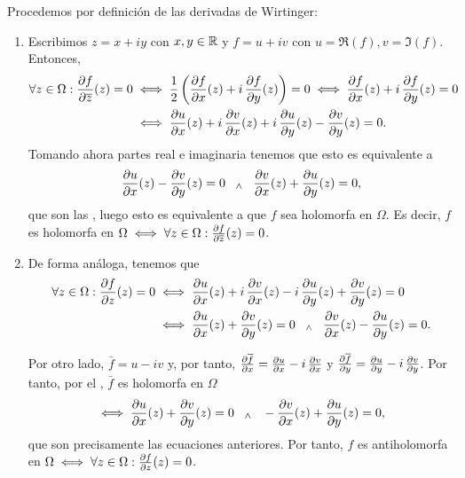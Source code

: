 \begin{dem}
    Procedemos por definición de las derivadas de Wirtinger:
    \begin{enumerate}[label=\textnormal{(\arabic*)}]
        \item Escribimos $z = x + iy$ con $x, y \in \mathbb{R}$ y $f = u + iv$ con $u = \Re(f), v = \Im(f)$. Entonces,
        \[
        \begin{aligned}
            \forall z \in \Omega : \pdv{f}{\overline{z}}(z) = 0 &\iff \frac{1}{2} \left(\pdv{f}{x}(z) + i \, \pdv{f}{y}(z)\right) = 0 \iff \pdv{f}{x}(z) + i \, \pdv{f}{y}(z) = 0 \\
            &\iff \pdv{u}{x}(z) + i \, \pdv{v}{x}(z) + i \, \pdv{u}{y}(z) - \pdv{v}{y}(z) = 0.
        \end{aligned}
        \]
        Tomando ahora partes real e imaginaria tenemos que esto es equivalente a
        \[
        \pdv{u}{x}(z) - \pdv{v}{y}(z) = 0 \;\;\; _{\wedge} \;\;\; \pdv{v}{x}(z) + \pdv{u}{y}(z) = 0,
        \]
        que son las , luego esto es equivalente a que $f$ sea holomorfa en $\Omega$. Es decir, $f$ es holomorfa en $\Omega \iff \forall z \in \Omega : \pdv{f}{\overline{z}}(z) = 0$.
        \item De forma análoga, tenemos que
        \[
        \begin{aligned}
            \forall z \in \Omega : \pdv{f}{z}(z) = 0 &\iff \pdv{u}{x}(z) + i \, \pdv{v}{x}(z) - i \, \pdv{u}{y}(z) + \pdv{v}{y}(z) = 0 \\
            &\iff \pdv{u}{x}(z) + \pdv{v}{y}(z) = 0 \;\;\; _{\wedge} \;\;\; \pdv{v}{x}(z) - \pdv{u}{y}(z) = 0.
        \end{aligned}
        \]

        Por otro lado, $\bar{f} = u - iv$ y, por tanto, $\pdv{\overline{f}}{x} = \pdv{u}{x} - i \, \pdv{v}{x}$ y $\pdv{\overline{f}}{y} = \pdv{u}{y} - i \, \pdv{v}{y}$. Por tanto, por el , $\bar{f}$ es holomorfa en $\Omega$
        \[
        \iff \pdv{u}{x}(z) + \pdv{v}{y}(z) = 0 \;\;\; _{\wedge} \;\;\; -\pdv{v}{x}(z) + \pdv{u}{y}(z) = 0,
        \]
        que son precisamente las ecuaciones anteriores. Por tanto, $f$ es antiholomorfa en $\Omega \iff \forall z \in \Omega : \pdv{f}{z}(z) = 0$.
    \end{enumerate}

    \vspace{-\baselineskip}
\end{dem}

